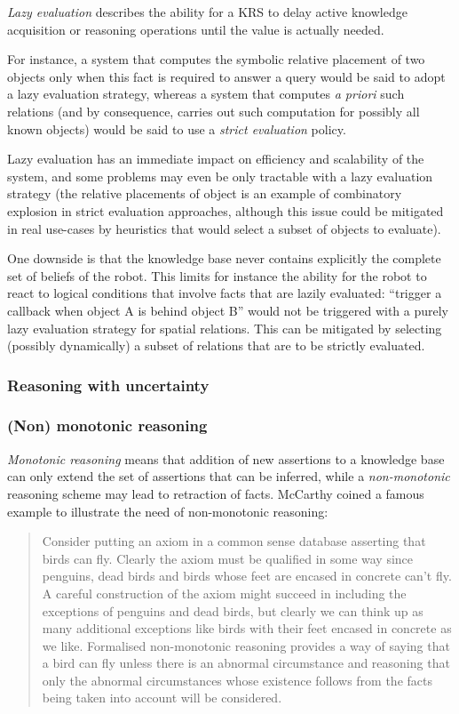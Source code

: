 \documentclass[a4paper, twocolumn]{article}
\begin{document}
\emph{Lazy evaluation} describes the ability for a KRS to delay active
knowledge acquisition or reasoning operations until the value is actually
needed.

For instance, a system that computes the symbolic relative placement of two
objects only when this fact is required to answer a query would be said to
adopt a lazy evaluation strategy, whereas a system that computes {\it a priori}
such relations (and by consequence, carries out such computation for possibly
all known objects) would be said to use a \emph{strict evaluation} policy.

Lazy evaluation has an immediate impact on efficiency and scalability of the
system, and some problems may even be only tractable with a lazy evaluation
strategy (the relative placements of object is an example of combinatory
explosion in strict evaluation approaches, although this issue could be
mitigated in real use-cases by heuristics that would select a subset of objects
to evaluate).

One downside is that the knowledge base never contains explicitly the complete
set of beliefs of the robot. This limits for instance the ability for the robot
to react to logical conditions that involve facts that are lazily evaluated:
``trigger a callback when object A is behind object B'' would not be triggered
with a purely lazy evaluation strategy for spatial relations. This can be
mitigated by selecting (possibly dynamically) a subset of relations that are to
be strictly evaluated.

\subsubsection{Reasoning with uncertainty}

\subsubsection{(Non) monotonic reasoning}

\emph{Monotonic reasoning} means that addition of new assertions to a knowledge base
can only extend the set of assertions that can be inferred, while a
\emph{non-monotonic} reasoning scheme may lead to retraction of facts.
McCarthy coined a famous example to illustrate the need of non-monotonic reasoning:

\begin{quotation}
Consider putting an axiom in a common sense database asserting that birds can
fly. Clearly the axiom must be qualified in some way since penguins, dead birds
and birds whose feet are encased in concrete can't fly. A careful construction
of the axiom might succeed in including the exceptions of penguins and dead
birds, but clearly we can think up as many additional exceptions like birds
with their feet encased in concrete as we like. Formalised non-monotonic
reasoning provides a way of saying that a bird can fly unless there
is an abnormal circumstance and reasoning that only the abnormal circumstances
whose existence follows from the facts being taken into account will be
considered.
\end{quotation}
\end{document}
